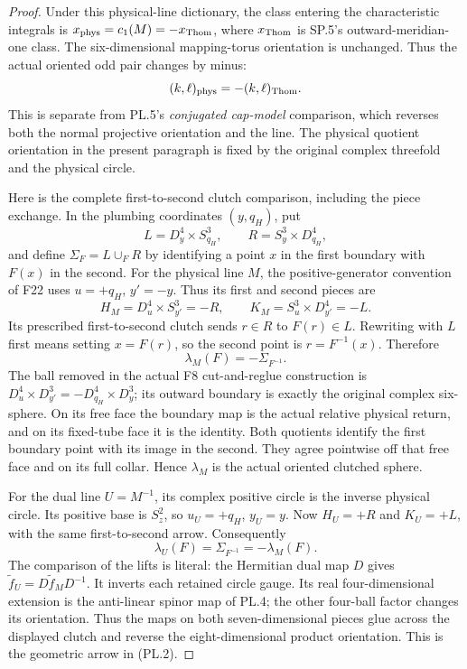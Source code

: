 \begin{proof}
Under this physical-line dictionary, the class entering the characteristic
integrals is \(x_{\rm phys}=c_1(M)=-x_{\rm Thom}\), where
\(x_{\rm Thom}\) is SP.5's outward-meridian-one class. The six-dimensional
mapping-torus orientation is unchanged. Thus the actual oriented odd
pair changes by minus:
\[
 (k,\ell)_{\rm phys}=-(k,\ell)_{\rm Thom}.
\]
This is separate from PL.5's \emph{conjugated cap-model} comparison, which
reverses both the normal projective orientation and the line. The
physical quotient orientation in the present paragraph is fixed by
the original complex threefold and the physical circle.

Here is the complete first-to-second clutch comparison, including the
piece exchange. In the plumbing coordinates \((y,q_H)\), put
\[
 L=D^4_y\times S^3_{q_H},\qquad
 R=S^3_y\times D^4_{q_H},
\]
and define \(\Sigma_F=L\cup_F R\) by identifying a point \(x\) in
the first boundary with \(F(x)\) in the second. For the physical line
\(M\), the positive-generator convention of F22 uses
\(u=+q_H\), \(y'=-y\). Thus its first and second pieces are
\[
 H_M=D^4_u\times S^3_{y'}=-R,\qquad
 K_M=S^3_u\times D^4_{y'}=-L.
\]
Its prescribed first-to-second clutch sends \(r\in R\) to
\(F(r)\in L\). Rewriting with \(L\) first means setting
\(x=F(r)\), so the second point is \(r=F^{-1}(x)\). Therefore
\[
                    \lambda_M(F)=-\Sigma_{F^{-1}}.
                                                        \tag{PL.1}
\]
The ball removed in the actual F8 cut-and-reglue construction is
\(D^4_u\times D^3_{y'}=-D^4_{q_H}\times D^3_y\); its outward
boundary is exactly the original complex six-sphere. On its free
face the boundary map is the actual relative physical return, and
on its fixed-tube face it is the identity. Both quotients identify
the first boundary point with its image in the second. They agree
pointwise off that free face and on its full collar. Hence
\(\lambda_M\) is the actual oriented clutched sphere.

For the dual line \(U=M^{-1}\), its complex positive circle is the
inverse physical circle. Its positive base is \(S^2_z\), so
\(u_U=+q_H\), \(y_U=y\). Now \(H_U=+R\) and \(K_U=+L\), with
the same first-to-second arrow. Consequently
\[
                  \lambda_U(F)=\Sigma_{F^{-1}}
                              =-\lambda_M(F).           \tag{PL.2}
\]
The comparison of the lifts is literal: the Hermitian dual map
\(D\) gives \(\widetilde f_U=D\widetilde f_M D^{-1}\).
It inverts each retained circle gauge. Its real four-dimensional
extension is the anti-linear spinor map of PL.4; the other four-ball
factor changes its orientation. Thus the maps on both seven-dimensional
pieces glue across the displayed clutch and reverse the eight-dimensional
product orientation. This is the geometric arrow in (PL.2).


\end{proof}
